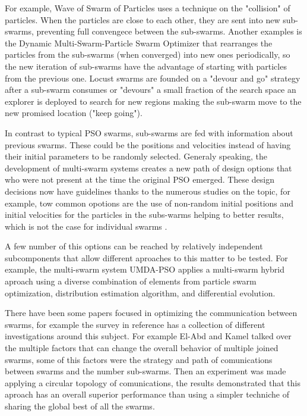 \documentclass[runningheads]{llncs}
\begin{document}
For example, Wave of Swarm of Particles \cite{b6} uses a technique on
the "collision" of particles. %
When the
particles are close to each other, they are sent into new sub-swarms,
preventing full convengece between the sub-swarms. Another examples is the Dynamic Multi-Swarm-Particle
Swarm Optimizer\cite{b7} that rearranges the particles from the sub-swarms
(when converged) into new ones periodically, so the new
iteration of sub-swarms have the advantage of starting with particles from the previous
one. Locust swarms \cite{b8} are founded on a "devour and go" strategy
after a sub-swarm consumes or "devours" a small fraction of the search space an explorer is deployed to search for
new regions making the sub-swarm move to the new promised location ("keep going").

In contrast to typical PSO swarms, sub-swarms are fed with information about
previous swarms. These could be the positions and velocities instead of having
their initial parameters to be randomly selected. Generaly speaking, the development of
multi-swarm systems creates a new path of design options that who were not present at the time the original PSO emerged. 
These design decisions now have guidelines thanks to the numerous studies on the topic, for
example, tow common opotions are the use of non-random initial positions and initial velocities for the particles in the subs-warms helping to
better results, which is not the case for individual swarms \cite{b9}.

A few number of this options can be reached by relatively independent
subcomponents that allow different aproaches to this matter to be
tested. For example, the multi-swarm system UMDA-PSO \cite{b10} 
applies a multi-swarm hybrid aproach using a diverse combination of 
elements from particle swarm optimization, distribution estimation 
algorithm, and differential evolution.

There have been some papers focused in optimizing the communication
between swarms, for example the survey in reference \cite{b15} has a
collection of different investigations around this subject. For
example El-Abd and Kamel talked over the multiple factors that can
change the overall behavior of multiple joined swarms, some of this factors
were the strategy and path of comunications between swarms and the number sub-swarms. 
Then an experiment was made applying a circular topology of comunications, 
the results demonstrated that this aproach has an overall superior performance 
than using a simpler techniche of sharing the global best of all the swarms\cite{b16}. 
\end{document}
